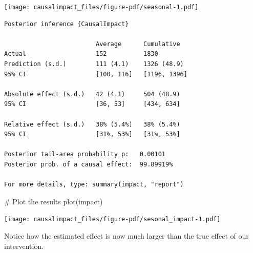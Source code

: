 \documentclass[
  letterpaper,
  DIV=11,
  numbers=noendperiod]{scrreprt}
\newenvironment{Shaded}{\begin{snugshade}}{\end{snugshade}}
\newcommand{\CommentTok}[1]{\textcolor[rgb]{0.37,0.37,0.37}{#1}}
\newcommand{\FunctionTok}[1]{\textcolor[rgb]{0.28,0.35,0.67}{#1}}
\newcommand{\NormalTok}[1]{\textcolor[rgb]{0.00,0.23,0.31}{#1}}
\newcommand{\OtherTok}[1]{\textcolor[rgb]{0.00,0.23,0.31}{#1}}
\newcommand{\SpecialCharTok}[1]{\textcolor[rgb]{0.37,0.37,0.37}{#1}}
\begin{document}
\texttt{[image: causalimpact\_files/figure-pdf/seasonal-1.pdf]}

\begin{Shaded}
\end{Shaded}

\begin{verbatim}
Posterior inference {CausalImpact}

                         Average      Cumulative  
Actual                   152          1830        
Prediction (s.d.)        111 (4.1)    1326 (48.9) 
95% CI                   [100, 116]   [1196, 1396]
                                                  
Absolute effect (s.d.)   42 (4.1)     504 (48.9)  
95% CI                   [36, 53]     [434, 634]  
                                                  
Relative effect (s.d.)   38% (5.4%)   38% (5.4%)  
95% CI                   [31%, 53%]   [31%, 53%]  

Posterior tail-area probability p:   0.00101
Posterior prob. of a causal effect:  99.89919%

For more details, type: summary(impact, "report")
\end{verbatim}

\begin{Shaded}
\begin{Highlighting}[]
\CommentTok{\# Plot the results}
\FunctionTok{plot}\NormalTok{(impact)}
\end{Highlighting}
\end{Shaded}

\texttt{[image: causalimpact\_files/figure-pdf/sesonal\_impact-1.pdf]}

Notice how the estimated effect is now much larger than the true effect
of our intervention.
\end{document}
